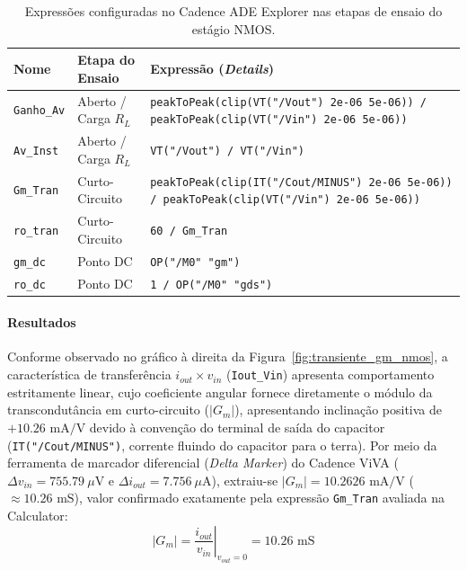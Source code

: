 \begin{table}[H]
    \centering
    \caption{Expressões configuradas no Cadence ADE Explorer nas etapas de ensaio do estágio NMOS.}
    \label{tab:expressoes_ade}
    \small
    \begin{tabular}{l l p{7.4cm}}
        \hline
        \textbf{Nome} & \textbf{Etapa do Ensaio} & \textbf{Expressão (\textit{Details})} \\
        \hline
        \texttt{Ganho\_Av} & Aberto / Carga $R_L$ & \texttt{peakToPeak(clip(VT("/Vout") 2e-06 5e-06)) / peakToPeak(clip(VT("/Vin") 2e-06 5e-06))} \\
        \texttt{Av\_Inst} & Aberto / Carga $R_L$ & \texttt{VT("/Vout") / VT("/Vin")} \\
        \texttt{Gm\_Tran} & Curto-Circuito & \texttt{peakToPeak(clip(IT("/Cout/MINUS") 2e-06 5e-06)) / peakToPeak(clip(VT("/Vin") 2e-06 5e-06))} \\
        \texttt{ro\_tran} & Curto-Circuito & \texttt{60 / Gm\_Tran} \\
        \texttt{gm\_dc} & Ponto DC & \texttt{OP("/M0" "gm")} \\
        \texttt{ro\_dc} & Ponto DC & \texttt{1 / OP("/M0" "gds")} \\
        \hline
    \end{tabular}
\end{table}

\paragraph{Resultados}
\vspace{0.2cm}
Conforme observado no gráfico à direita da Figura~\ref{fig:transiente_gm_nmos}, a característica de transferência $i_{out} \times v_{in}$ (\texttt{Iout\_Vin}) apresenta comportamento estritamente linear, cujo coeficiente angular fornece diretamente o módulo da transcondutância em curto-circuito ($|G_m|$), apresentando inclinação positiva de $+10.26\text{ mA/V}$ devido à convenção do terminal de saída do capacitor (\texttt{IT("/Cout/MINUS")}, corrente fluindo do capacitor para o terra). Por meio da ferramenta de marcador diferencial (\textit{Delta Marker}) do Cadence ViVA ($\Delta v_{in} = 755.79\ \mu\text{V}$ e $\Delta i_{out} = 7.756\ \mu\text{A}$), extraiu-se $|G_m| = 10.2626\text{ mA/V}$ ($\approx 10.26\text{ mS}$), valor confirmado exatamente pela expressão \texttt{Gm\_Tran} avaliada na Calculator:
\begin{equation}
    |G_m| = \left.\frac{i_{out}}{v_{in}}\right|_{v_{out}=0} = 10.26\text{ mS}
\end{equation}

